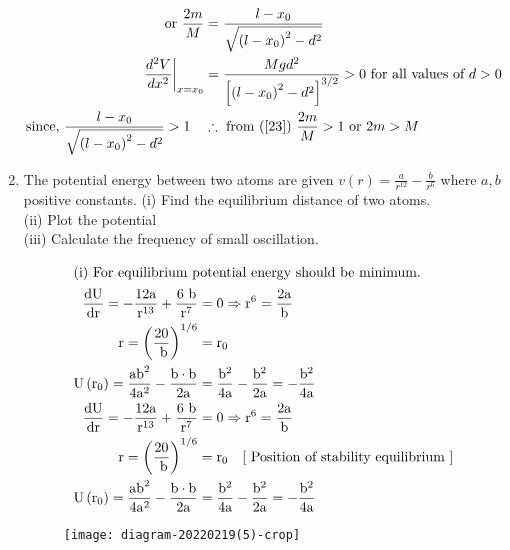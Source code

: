 \begin{enumerate}
\begin{answer}
\begin{align}
	\text{	or }\frac{2 m}{M}&=\frac{l-x_{0}}{\sqrt{\left(l-x_{0}\right)^{2}-d^{2}}}\label{23}\\
	\left.\frac{d^{2} V}{d x^{2}}\right|_{x=x_{0}}&=\frac{M g d^{2}}{\left[\left(l-x_{0}\right)^{2}-d^{2}\right]^{3 / 2}}>0\text{ for all values of $d>0$}\notag\\
	\text{since, }\frac{l-x_{0}}{\sqrt{\left(l-x_{0}\right)^{2}-d^{2}}}>1 \quad &\therefore\text{ from (\ref{23}) }\frac{2 m}{M}>1\text{ or }2 m>M\notag
		\end{align}
	\end{answer}
\item The potential energy between two atoms are given $v(r)=\frac{a}{r^{12}}-\frac{b}{r^{6}}$ where $a, b$ positive constants.
(i) Find the equilibrium distance of two atoms.\\
(ii) Plot the potential\\
(iii) Calculate the frequency of small oscillation.\\
	\begin{answer}
		\begin{align*}
		\intertext{(i) For equilibrium potential energy should be minimum.}
		\frac{\mathrm{dU}}{\mathrm{dr}}=-\frac{12 \mathrm{a}}{\mathrm{r}^{13}}+\frac{6 \mathrm{~b}}{\mathrm{r}^{7}}&=0 \Rightarrow \mathrm{r}^{6}=\frac{2 \mathrm{a}}{\mathrm{b}} \\
		\mathrm{r}=\left(\frac{20}{\mathrm{~b}}\right)^{1 / 6}&=\mathrm{r}_{0} \\
		\mathrm{U}\left(\mathrm{r}_{0}\right)=\frac{\mathrm{ab}^{2}}{4 \mathrm{a}^{2}}-\frac{\mathrm{b} \cdot \mathrm{b}}{2 \mathrm{a}}&=\frac{\mathrm{b}^{2}}{4 \mathrm{a}}-\frac{\mathrm{b}^{2}}{2 \mathrm{a}}=-\frac{\mathrm{b}^{2}}{4 \mathrm{a}}\\
		\frac{\mathrm{dU}}{\mathrm{dr}}=-\frac{12 \mathrm{a}}{\mathrm{r}^{13}}+\frac{6 \mathrm{~b}}{\mathrm{r}^{7}}&=0 \Rightarrow \mathrm{r}^{6}=\frac{2 \mathrm{a}}{\mathrm{b}}\\ \mathrm{r}=\left(\frac{20}{\mathrm{~b}}\right)^{1 / 6}&=\mathrm{r}_{0} \quad[\text{ Position of stability equilibrium }]\\ \mathrm{U}\left(\mathrm{r}_{0}\right)=\frac{\mathrm{ab}^{2}}{4 \mathrm{a}^{2}}-\frac{\mathrm{b} \cdot \mathrm{b}}{2 \mathrm{a}}&=\frac{\mathrm{b}^{2}}{4 \mathrm{a}}-\frac{\mathrm{b}^{2}}{2 \mathrm{a}}=-\frac{\mathrm{b}^{2}}{4 \mathrm{a}}
			\end{align*}
			\begin{figure}[H]
				\centering
				\texttt{[image: diagram-20220219(5)-crop]}

\end{figure}
\end{answer}
\end{enumerate}
